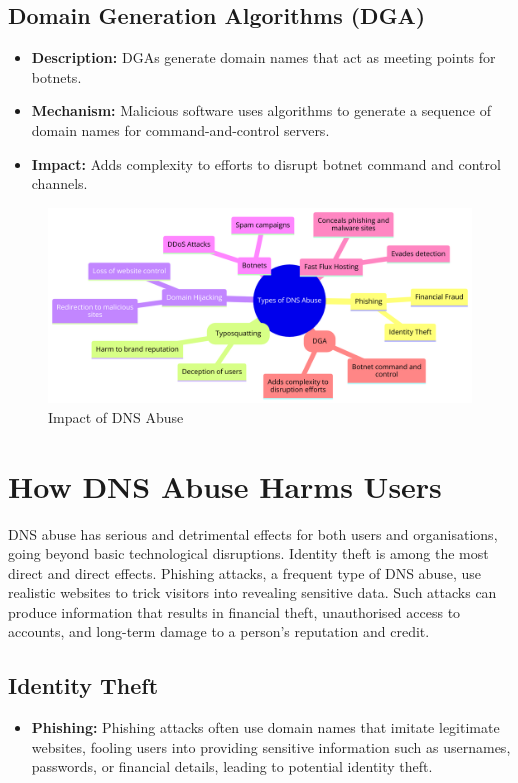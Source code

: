 \subsection{Domain Generation Algorithms (DGA)}
\begin{itemize}
    \item \textbf{Description:} DGAs generate domain names that act as meeting points for botnets.\cite{antonakakis2012throw}
    \item \textbf{Mechanism:} Malicious software uses algorithms to generate a sequence of domain names for command-and-control servers.
    \item \textbf{Impact:} Adds complexity to efforts to disrupt botnet command and control channels.
\end{itemize}
\captionsetup{font= small}
\begin{figure}[ht!]
\centering
\includegraphics[width=1.0\textwidth]{background/DNSabuseForms.png}
\caption{Impact of DNS Abuse}
\label{fig:figureThree}
\end{figure}



\section{How DNS Abuse Harms Users}

DNS abuse has serious and detrimental effects for both users and organisations, going beyond basic technological disruptions. Identity theft is among the most direct and direct effects. Phishing attacks, a frequent type of DNS abuse, use realistic websites to trick visitors into revealing sensitive data. Such attacks can produce information that results in financial theft, unauthorised access to accounts, and long-term damage to a person's reputation and credit.

\subsection{Identity Theft}
\begin{itemize}
    \item \textbf{Phishing:} Phishing attacks often use domain names that imitate legitimate websites, fooling users into providing sensitive information such as usernames, passwords, or financial details, leading to potential identity theft.\cite{godaddy2023dnsabuse, jakobsson2006phishing}
\end{itemize}

